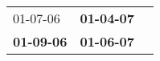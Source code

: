 \begin{supertabular}{p{0.33\columnwidth}p{0.33\columnwidth}p{0.33\columnwidth}}
          01-07-06\textsuperscript{} &  \textbf{01-04-07\textsuperscript{}} \\
 \textbf{01-09-06\textsuperscript{}} &  \textbf{01-06-07\textsuperscript{}} \\
\end{supertabular}
